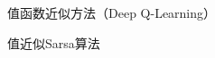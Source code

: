 \begin{section}{值函数近似方法\alert{（Deep Q-Learning）}}
\begin{frame}{值近似Sarsa算法}
\begin{center}
\begin{minipage}{0.3\textwidth}
        \end{minipage}
    \end{center}
    
\end{frame}

\end{section}